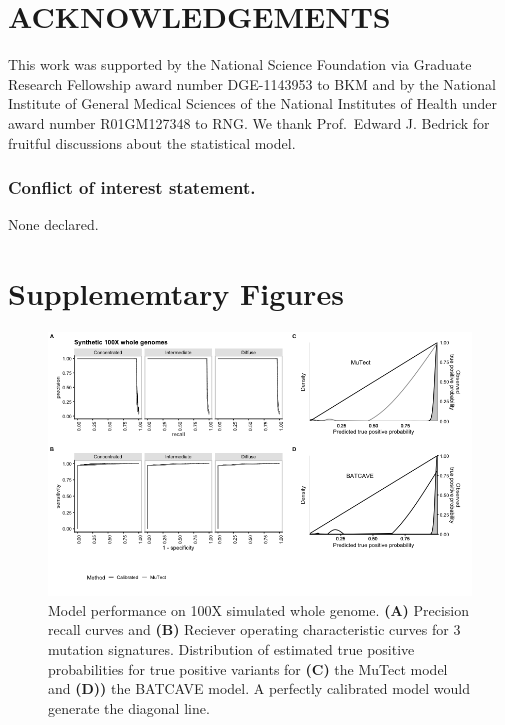 \documentclass[a4,center,fleqn]{NAR}
\newcommand{\batcave}{BATCAVE\xspace}
\newcommand{\beginsupplement}{%
        \clearpage
        \onecolumn
        \setcounter{table}{0}
        \renewcommand{\thetable}{S\arabic{table}}%
        \setcounter{figure}{0}
        \renewcommand{\thefigure}{S\arabic{figure}}%
     }
\begin{document}
\section{ACKNOWLEDGEMENTS}

This work was supported by the National Science Foundation via Graduate Research Fellowship award number DGE-1143953 to BKM and by the National Institute of General Medical Sciences of the National Institutes of Health under award number R01GM127348 to RNG.
We thank Prof.\ Edward J. Bedrick for fruitful discussions about the statistical model.

\subsubsection{Conflict of interest statement.} None declared.



\beginsupplement
\section{Supplememtary Figures}

\begin{figure}[b]
  \begin{center}
  \includegraphics[width=\textwidth]{figures/fig_wgs.png}
  \end{center}
  \caption{Model performance on 100X simulated whole genome.
  \textbf{(A)} Precision recall curves and \textbf{(B)} Reciever operating characteristic curves for 3 mutation signatures.
  Distribution of estimated true positive probabilities for true positive  variants for \textbf{(C)} the MuTect model and \textbf{(D))} the \batcave model.
  A perfectly calibrated model would generate the diagonal line.}
\label{NAR-wgs_fig}
\end{figure}
\end{document}
